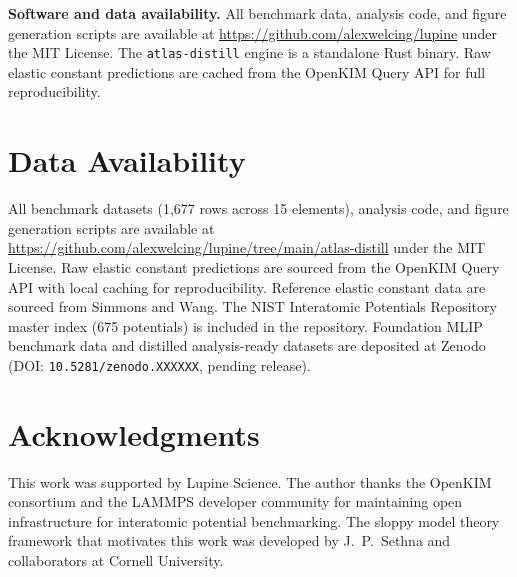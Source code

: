 \documentclass[twocolumn,9pt]{extarticle}
\begin{document}
\textbf{Software and data availability.} All benchmark data, analysis code, and figure generation scripts are available at \url{https://github.com/alexwelcing/lupine} under the MIT License. The \texttt{atlas-distill} engine is a standalone Rust binary. Raw elastic constant predictions are cached from the OpenKIM Query API for full reproducibility.

\section*{Data Availability}

All benchmark datasets (1,677 rows across 15 elements), analysis code, and figure generation scripts are available at \url{https://github.com/alexwelcing/lupine/tree/main/atlas-distill} under the MIT License. Raw elastic constant predictions are sourced from the OpenKIM Query API\cite{openkim} with local caching for reproducibility. Reference elastic constant data are sourced from Simmons and Wang\cite{simmons1971}. The NIST Interatomic Potentials Repository master index (675 potentials) is included in the repository. Foundation MLIP benchmark data and distilled analysis-ready datasets are deposited at Zenodo (DOI: \texttt{10.5281/zenodo.XXXXXX}, pending release).

\section*{Acknowledgments}

This work was supported by Lupine Science. The author thanks the OpenKIM consortium and the LAMMPS developer community for maintaining open infrastructure for interatomic potential benchmarking. The sloppy model theory framework that motivates this work was developed by J.~P.~Sethna and collaborators at Cornell University.



\end{document}
